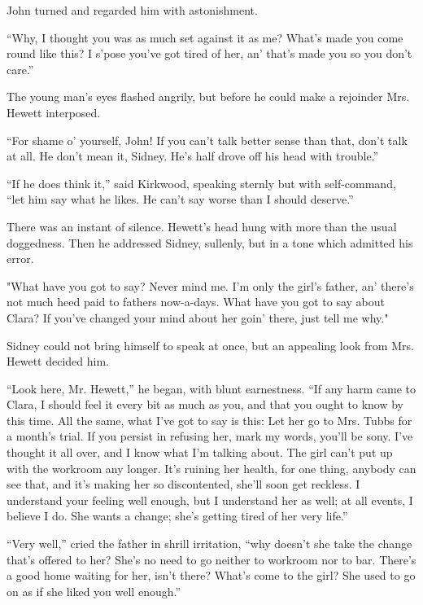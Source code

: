 {}John turned and regarded him with astonishment.

``Why, I thought you was as much set against it as me? What's made you
come round like this? I s'pose you've got tired of her, an' that's made
you so you don't care.''

The young man's eyes flashed angrily, but before he could make a
rejoinder Mrs. Hewett interposed.

``For shame o' yourself, John! If you can't talk better sense than that,
don't talk at all. He don't mean it, Sidney. He's half drove off his
head with trouble.''

``If he does think it,'' said Kirkwood, speaking sternly but with
self-command, ``let him say what he likes. He can't say worse than I
should deserve.''

There was an instant of silence. Hewett's head hung with more than the
usual doggedness. Then he addressed Sidney, sullenly, but in a tone
which admitted his error.

"What have you got to say? Never mind me. I'm only the girl's father,
an' there's not {}much heed paid to fathers now-a-days. What have you
got to say about Clara? If you've changed your mind about her goin'
there, just tell me why."

Sidney could not bring himself to speak at once, but an appealing look
from Mrs. Hewett decided him.

``Look here, Mr. Hewett,'' he began, with blunt earnestness. ``If any
harm came to Clara, I should feel it every bit as much as you, and that
you ought to know by this time. All the same, what I've got to say is
this: Let her go to Mrs. Tubbs for a month's trial. If you persist in
refusing her, mark my words, you'll be sony. I've thought it all over,
and I know what I'm talking about. The girl can't put up with the
workroom any longer. It's ruining her health, for one thing, anybody can
see that, and it's making her so discontented, she'll soon get reckless.
I understand your feeling well enough, but I understand her as well; at
all events, I believe I do. She wants a change; she's getting tired of
her very life.''

{}``Very well,'' cried the father in shrill irritation, ``why doesn't
she take the change that's offered to her? She's no need to go neither
to workroom nor to bar. There's a good home waiting for her, isn't
there? What's come to the girl? She used to go on as if she liked you
well enough.''

